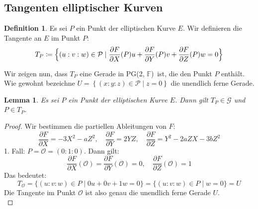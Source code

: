 \documentclass[hidelinks]{article}
\theoremstyle{plain}
\newtheorem{lem}[thm]{Lemma}
\theoremstyle{definition}
\newtheorem{defn}[thm]{Definition}
\theoremstyle{rem}
\newcommand{\pgtwo}{PG(2, $\mathbb{F}$)\ }
\newcommand{\patinf}{\mathcal{O}}
\begin{document}
\begin{sloppypar}
\subsection{Tangenten elliptischer Kurven}
\begin{defn}
	Es sei $P$ ein Punkt der elliptischen Kurve $E$. Wir definieren die Tangente an $E$ im Punkt $P$:
\begin{equation*}
	T_P\coloneqq\Bigl\{(u:v:w)\in\mathcal{P}\mid\frac{\partial F}{\partial X}(P)u+\frac{\partial F}{\partial Y}(P)v+\frac{\partial F}{\partial Z}(P)w=0\Bigr\}
\end{equation*}
\end{defn}
Wir zeigen nun, dass $T_P$ eine Gerade in \pgtwo ist, die den Punkt $P$ enthält. Wie gewohnt bezeichne $U=\left\{ (x:y:z) \in \mathcal{P} \mid z = 0 \right\}$ die unendlich ferne Gerade.

\begin{lem}\label{proj-tang}
	Es sei $P$ ein Punkt der elliptischen Kurve $E$. Dann gilt $T_P\in\mathcal{G}$ und $P\in T_P$.
\end{lem}
\begin{proof}
	Wir bestimmen die partiellen Ableitungen von $F$:
	\begin{equation*}
		\frac{\partial F}{\partial X}=-3X^2-aZ^2,\quad \frac{\partial F}{\partial Y}=2YZ,\quad \frac{\partial F}{\partial Z}=Y^2-2aZX-3bZ^2
	\end{equation*}
	1. Fall: $P=\patinf=(0:1:0)$. Dann gilt:
	\begin{equation*}
		\frac{\partial F}{\partial X}(\patinf)=\frac{\partial F}{\partial Y}(\patinf)=0,\quad \frac{\partial F}{\partial Z}(\patinf)=1
	\end{equation*}
	Das bedeutet:
	\begin{equation*}
		T_{\patinf}=\{(u:v:w)\in P\mid 0u+0v+1w=0\}=\{(u:v:w)\in P\mid w=0\}=U
	\end{equation*}
	Die Tangente im Punkt $\patinf$ ist also genau die unendlich ferne Gerade $U$.\\


\end{proof}
\end{sloppypar}
\end{document}
